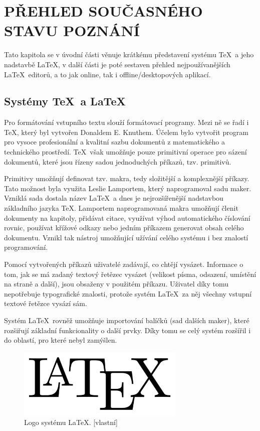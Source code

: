 
\chapter{PŘEHLED SOUČASNÉHO STAVU POZNÁNÍ}
Tato kapitola se v úvodní části věnuje krátkému představení systému \TeX\ a jeho nadstavbě \LaTeX, v další části je poté sestaven přehled nejpoužívanějších \LaTeX\ editorů, a to jak online, tak i offline/desktopových aplikací.

\section{Systémy \TeX\ a \LaTeX}
Pro formátování vstupního textu slouží formátovací programy. Mezi ně se řadí i \TeX, který byl vytvořen Donaldem E. Knuthem. Účelem bylo vytvořit program pro vysoce profesionální a kvalitní sazbu dokumentů z matematického a technického prostředí. \TeX\ však umožňuje pouze primitivní operace pro sázení dokumentů, které jsou řízeny sadou jednoduchých příkazů, tzv. primitivů. \cite{Kopka}

Primitivy umožňují definovat tzv. makra, tedy složitější a komplexnější příkazy. Tato možnost byla využita Leslie Lamportem, který naprogramoval sadu maker. Vzniklá sada dostala název \LaTeX\ a dnes je nejrozšířenější nadstavbou základního jazyka \TeX. Lamportem naprogramovaná makra umožňují členit dokumenty na kapitoly, přidávat citace, využívat výhod automatického číslování rovnic, používat křížové odkazy nebo jedním příkazem generovat obsah celého dokumentu. Vznikl tak nástroj umožňující užívání celého systému i bez znalostí programování. \cite{Kopka}

Pomocí vytvořených příkazů uživatelé zadávají, co chtějí vysázet. Informace o tom, jak se má zadaný textový řetězec vysázet (velikost písma, odsazení, umístění na straně a další), jsou obsaženy v použitém příkazu. Uživatel díky tomu nepotřebuje typografické znalosti, protože systém \LaTeX\ za něj všechny vstupní textové řetězce vysází sám. \cite{Rybicka}

Systém \LaTeX\ rovněž umožňuje importování balíčků (sad dalších maker), které rozšiřují základní funkcionality o další prvky. Díky tomu se celý systém rozšířil i do oblastí, pro které nebyl zamýšlen. \cite{Kopka}

\begin{figure}[h]
	\centering
	\includegraphics[width=8cm]{obrázky/latex.png}
	\caption[Logo systému \LaTeX.]{Logo systému \LaTeX. [vlastní]}
	\label{fig:latexlogo}
\end{figure}

